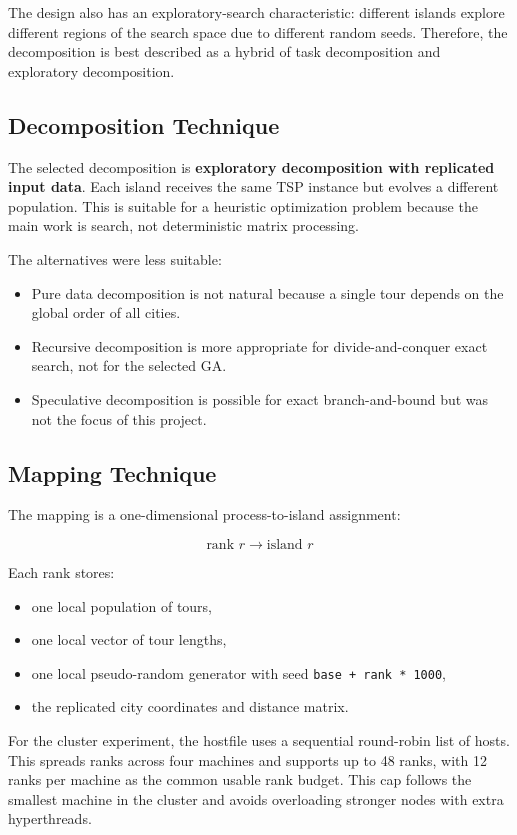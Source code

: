 \documentclass[11pt,a4paper]{article}
\begin{document}
The design also has an exploratory-search characteristic: different islands
explore different regions of the search space due to different random seeds.
Therefore, the decomposition is best described as a hybrid of task decomposition
and exploratory decomposition.

\subsection{Decomposition Technique}
The selected decomposition is \textbf{exploratory decomposition with replicated
input data}. Each island receives the same TSP instance but evolves a different
population. This is suitable for a heuristic optimization problem because the
main work is search, not deterministic matrix processing.

The alternatives were less suitable:

\begin{itemize}[leftmargin=*]
  \item Pure data decomposition is not natural because a single tour depends on
  the global order of all cities.
  \item Recursive decomposition is more appropriate for divide-and-conquer exact
  search, not for the selected GA.
  \item Speculative decomposition is possible for exact branch-and-bound but was
  not the focus of this project.
\end{itemize}

\subsection{Mapping Technique}
The mapping is a one-dimensional process-to-island assignment:

\[
  \text{rank } r \longrightarrow \text{island } r
\]

Each rank stores:

\begin{itemize}[leftmargin=*]
  \item one local population of tours,
  \item one local vector of tour lengths,
  \item one local pseudo-random generator with seed \texttt{base + rank * 1000},
  \item the replicated city coordinates and distance matrix.
\end{itemize}

For the cluster experiment, the hostfile uses a sequential round-robin list of
hosts. This spreads ranks across four machines and supports up to 48 ranks, with
12 ranks per machine as the common usable rank budget. This cap follows the
smallest machine in the cluster and avoids overloading stronger nodes with extra
hyperthreads.
\end{document}
